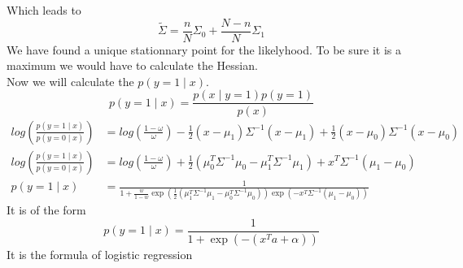 \documentclass[]{article}
\begin{document}
Which leads to 
$$ \tilde{\Sigma} = \frac{n}{N}\Sigma_0 + \frac{N-n}{N}\Sigma_1 $$
We have found a unique stationnary point for the likelyhood. To be sure it is a maximum we would have to calculate the Hessian.\\
Now we will calculate the $p(y=1 \mid x)$.
$$p(y=1 \mid x) = \frac{p(x \mid y=1)p(y=1)}{p(x)}$$
\begin{align*}
log(\frac{p(y=1 \mid x)}{p(y=0 \mid x)}) &= log(\frac{1-\omega}{\omega}) - \frac{1}{2}(x - \mu_1)\Sigma^{-1}(x - \mu_1) + \frac{1}{2}(x - \mu_0)\Sigma^{-1}(x - \mu_0) \\
log(\frac{p(y=1 \mid x)}{p(y=0 \mid x)}) &= log(\frac{1-\omega}{\omega}) + \frac{1}{2}(\mu_0^T\Sigma^{-1}\mu_0 - \mu_1^T\Sigma^{-1}\mu_1) + x^T\Sigma^{-1}(\mu_1-\mu_0) \\
p(y=1 \mid x) &= \frac{1}{1+\frac{w}{1-w}\exp{(\frac{1}{2}(\mu_1^T\Sigma^{-1}\mu_1 - \mu_0^T\Sigma^{-1}\mu_0 ))}\exp{(-x^T\Sigma^{-1}(\mu_1-\mu_0))}}
\end{align*}
It is of the form
$$ p(y=1 \mid x) = \frac{1}{1+\exp{(-(x^Ta+\alpha))}} $$
It is the formula of logistic regression
\end{document}
